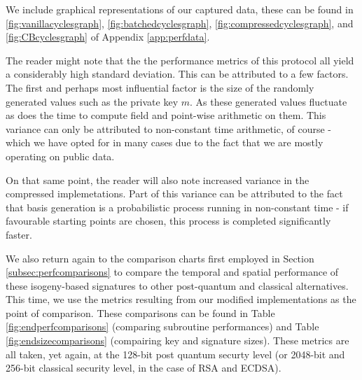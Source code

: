 We include graphical representations of our captured data, these can be found in \ref{fig:vanillacyclesgraph}, \ref{fig:batchedcyclesgraph}, \ref{fig:compressedcyclesgraph}, and \ref{fig:CBcyclesgraph} of Appendix \ref{app:perfdata}.

The reader might note that the the performance metrics of this protocol all yield a considerably high standard deviation. This can be attributed to a few factors. The first and perhaps most influential factor is the size of the randomly generated values such as the private key $m$. As these generated values fluctuate as does the time to compute field and point-wise arithmetic on them. This variance can only be attributed to non-constant time arithmetic, of course - which we have opted for in many cases due to the fact that we are mostly operating on public data.

On that same point, the reader will also note increased variance in the compressed implemetations. Part of this variance can be attributed to the fact that basis generation is a probabilistic process running in non-constant time - if favourable starting points are chosen, this process is completed significantly faster.

We also return again to the comparison charts first employed in Section \ref{subsec:perfcomparisons} to compare the temporal and spatial performance of these isogeny-based signatures to other post-quantum and classical alternatives. This time, we use the metrics resulting from our modified implementations as the point of comparison. These comparisons can be found in Table \ref{fig:endperfcomparisons} (comparing subroutine performances) and Table \ref{fig:endsizecomparisons} (compairing key and signature sizes). These metrics are all taken, yet again, at the 128-bit post quantum securty level (or 2048-bit and 256-bit classical security level, in the case of RSA and ECDSA).

